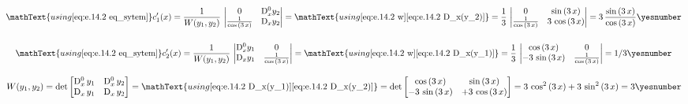 \documentclass["AM3C-Slides_annotations.tex"]{subfiles}
\begin{document}
\begin{exampleBox}
  \begin{gather*}
    \mathText{using \eqref{eq:e.14.2 eq_sytem}}
    c_1'(x)
    = \frac{1}{W(y_1,y_2)}
    \,\begin{vmatrix}
      0 
      &  \mdif[0]{x}y_2
      \\ \frac{1}{\cos{(3\,x)}}
      &  \mdif[1]{x}y_2
    \end{vmatrix}
    = 
    \mathText{using 
      \eqref{eq:e.14.2 w}
      \eqref{eq:e.14.2 D_x(y_2)}
    }
    = \frac{1}{3}
    \,\begin{vmatrix}
      0 
      &  \sin{(3\,x)}
      \\ \frac{1}{\cos{(3\,x)}}
      &  3\,\cos{(3\,x)}
    \end{vmatrix}
    = 3\,\frac{\sin{(3\,x)}}{\cos{(3\,x)}}
    \yesnumber\label{eq:e.14.2 c_1'}
    \\[3ex]
    \mathText{using \eqref{eq:e.14.2 eq_sytem}}
    c_2'(x)
    = \frac{1}{W(y_1,y_2)}
    \,\begin{vmatrix}
      \mdif[0]{x}y_1
      &  0 
      \\ \mdif[1]{x}y_1
      &  \frac{1}{\cos{(3\,x)}}
    \end{vmatrix}
    =
    \mathText{using 
      \eqref{eq:e.14.2 w}
      \eqref{eq:e.14.2 D_x(y_1)}
    }
    = \frac{1}{3}
    \,\begin{vmatrix}
      \cos{(3\,x)}
      &  0 
      \\ -3\,\sin{(3\,x)}
      &  \frac{1}{\cos{(3\,x)}}
    \end{vmatrix}
    = 1/3
    \yesnumber\label{eq:e.14.2 c_2'}
  \end{gather*}

  \begin{gather*}
    W(y_1,y_2)
    = \det\begin{bmatrix}
      \mdif[0]{x}\,y_1
      &  \mdif[0]{x}\,y_2
      \\ \mdif[1]{x}\,y_1
      &  \mdif[1]{x}\,y_2
    \end{bmatrix}
    =
    \mathText{using 
      \eqref{eq:e.14.2 D_x(y_1)}
      \eqref{eq:e.14.2 D_x(y_2)}
    }
    = \det\begin{bmatrix}
      \cos{(3\,x)}
      &  \sin{(3\,x)}
      \\ -3\,\sin{(3\,x)}
      &  +3\,\cos{(3\,x)}
    \end{bmatrix}
    = 3\,\cos^2{(3\,x)}
    +3\,\sin^2{(3\,x)}
    = 3
    \yesnumber\label{eq:e.14.2 w}
  \end{gather*}


\end{exampleBox}
\end{document}
